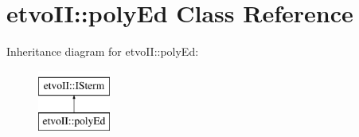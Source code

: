 \hypertarget{classetvo_i_i_1_1poly_ed}{}\section{etvo\+II\+:\+:poly\+Ed Class Reference}
\label{classetvo_i_i_1_1poly_ed}
Inheritance diagram for etvo\+II\+:\+:poly\+Ed\+:\begin{figure}[H]
\begin{center}
\leavevmode
\includegraphics[height=2.000000cm]{classetvo_i_i_1_1poly_ed}
\end{center}
\end{figure}
